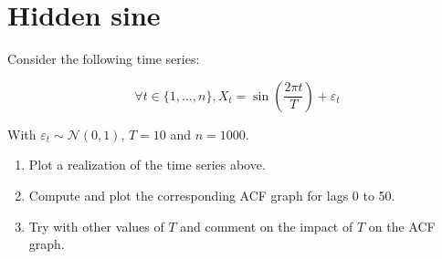 \section{Hidden sine}
Consider the following time series: 

\[
    \forall t \in \lbrace 1, \ldots, n \rbrace, X_t = \sin\left(\frac{2\pi t}{T}\right) + \varepsilon_t
\]

\noindent With $\varepsilon_t \sim \mathcal{N}(0, 1)$, $T = 10$ and $n = 1000$.

\begin{enumerate}
    \item Plot a realization of the time series above.
    \item Compute and plot the corresponding ACF graph for lags 0 to 50.
    \item Try with other values of $T$ and comment on the impact of $T$ on the ACF graph.
\end{enumerate}

